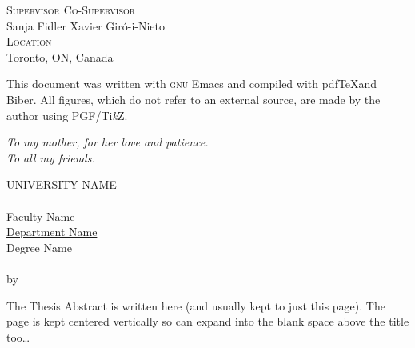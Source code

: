 \noindent \textsc{Supervisor} \hfill \textsc{Co-Supervisor} \\
Sanja Fidler \hfill Xavier Giró-i-Nieto \\

\noindent \textsc{Location} \\
Toronto, ON, Canada \\

\doclicenseThis

\noindent This document was written with \textsc{gnu} Emacs and compiled with
pdf\TeX and Biber. All figures, which do not refer to an external source, are
made by the author using PGF/Ti\emph{k}Z.
\normalsize


\cleardoublepage
\thispagestyle{empty}
\begin{flushright}
  \itshape
  To my mother, for her love and patience. \\
  To all my friends.
\end{flushright}


\cleardoublepage
\thispagestyle{plain}
\null
\vfill
\begin{center}
  \makeatletter
  \MakeUppercase{\href{https://href.com}{University Name}} \\
  \vspace{20pt}
  {\huge \textit{\abstractname}} \\
  \bigskip
  \href{https://href.com}{Faculty Name} \\
  \href{https://href.com}{Department Name} \\
  \bigskip
  Degree Name \\
  \bigskip
  \textbf{\@title} \\
  \medskip
  by \@author \\
  \bigskip
  \makeatother
\end{center}
The Thesis Abstract is written here (and usually kept to just this page). The
page is kept centered vertically so can expand into the blank space above the
title too\ldots
\vfill
\null


